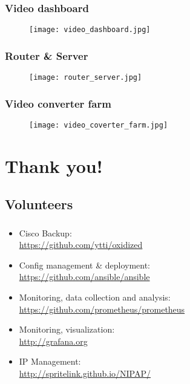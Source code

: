 \documentclass[t]{beamer}
\begin{document}
\begin{frame}
	\frametitle{Video dashboard}
	\vfill
	\begin{figure}[ht!]
		\texttt{[image: video\_dashboard.jpg]}
	\end{figure}
	\vfill
\end{frame}

\begin{frame}
	\frametitle{Router \& Server}
	\vfill
	\begin{figure}[ht!]
		\texttt{[image: router\_server.jpg]}
	\end{figure}
	\vfill
\end{frame}

\begin{frame}
	\frametitle{Video converter farm}
	\vfill
	\begin{figure}[ht!]
		\texttt{[image: video\_coverter\_farm.jpg]}
	\end{figure}
	\vfill
\end{frame}

\section{Thank you!}

\subsection{Volunteers}

\begin{frame}
	\frametitle{}
	\vfill
	\begin{itemize}
		\item Cisco Backup: \\ \url{https://github.com/ytti/oxidized}
		\item Config management \& deployment: \\ \url{https://github.com/ansible/ansible}
		\item Monitoring, data collection and analysis: \\ \url{https://github.com/prometheus/prometheus}
		\item Monitoring, visualization: \\ \url{http://grafana.org}
		\item IP Management: \\ \url{http://spritelink.github.io/NIPAP/}
	\end{itemize}
	\vfill
\end{frame}
\end{document}
